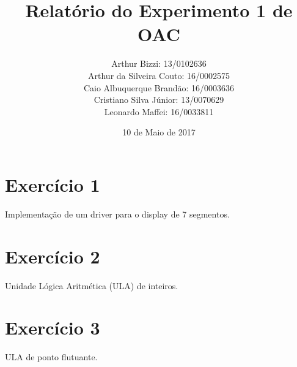 \documentclass[12pt, a4paper, twoside]{article}
\begin{document}
\title{Relatório do Experimento 1 de OAC}
\author{
Arthur Bizzi: 13/0102636 \\
Arthur da Silveira Couto: 16/0002575 \\
Caio Albuquerque Brandão: 16/0003636 \\
Cristiano Silva Júnior: 13/0070629 \\
Leonardo Maffei: 16/0033811 \\}
\date{10 de Maio de 2017}
\maketitle

\section{Exercício 1}

Implementação de um driver para o display de 7 segmentos.


\section{Exercício 2}

Unidade Lógica Aritmética (ULA) de inteiros.

\section{Exercício 3}

ULA de ponto flutuante.
\end{document}
